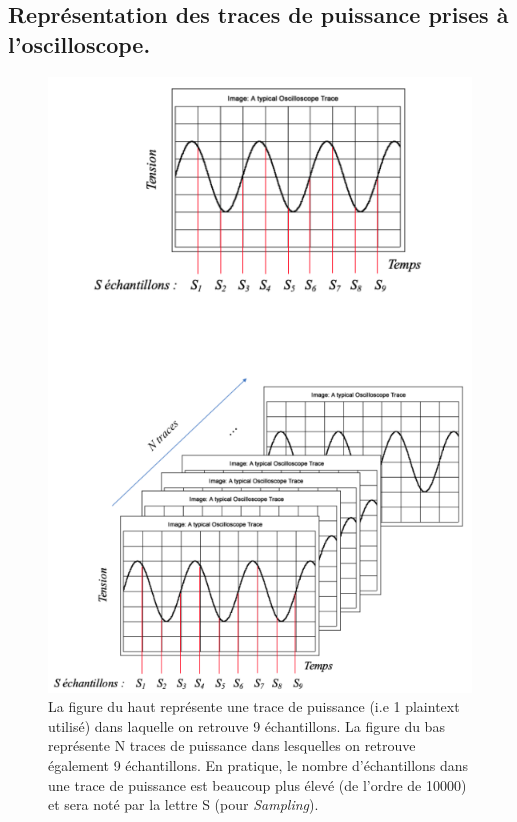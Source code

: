 \documentclass[oneside]{book}
\begin{document}
\begin{appendices}
\section{Représentation des traces de puissance prises à l'oscilloscope.}
\label{ann:traceExplain}
\begin{figure}[htbp]
    \centering
    \includegraphics[scale=0.65]{image/Sampling}
    \caption{La figure du haut représente une trace de puissance (i.e 1 plaintext utilisé) dans laquelle on retrouve 9 échantillons. La figure du bas représente N traces de puissance dans lesquelles on retrouve également 9 échantillons. En pratique, le nombre d'échantillons dans une trace de puissance est beaucoup plus élevé (de l'ordre de 10000) et sera noté par la lettre S (pour \textit{Sampling}).}
    \label{fig:traceExplain}
\end{figure}


\end{appendices}
\end{document}
